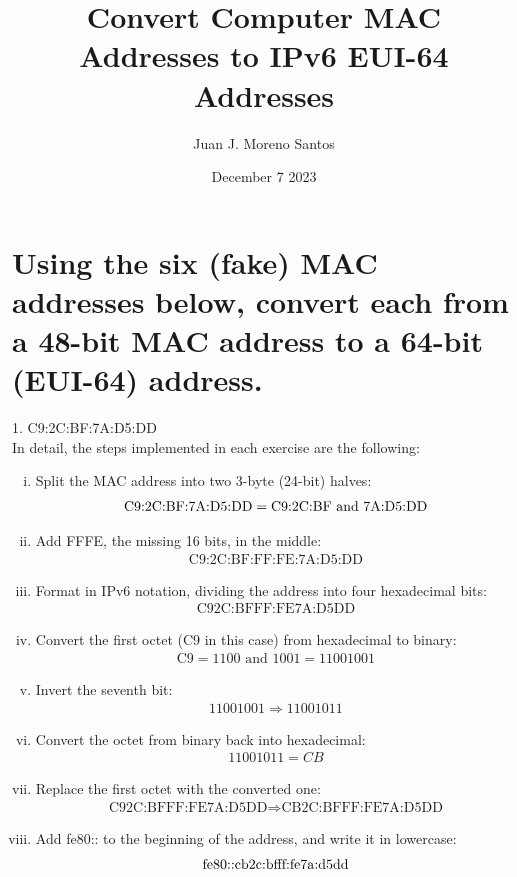 \documentclass[11pt]{article}
\newcommand*{\set}{\setcounter{equation}{0}}
\begin{document}
\title{Convert Computer MAC Addresses to IPv6 EUI-64 Addresses}
\author{Juan J. Moreno Santos}
\date{December 7 2023}

\maketitle
\section{Using the six (fake) MAC addresses below, convert each from a 48-bit MAC address to a 64-bit (EUI-64) address.}
1. C9:2C:BF:7A:D5:DD\\
\indent In detail, the steps implemented in each exercise are the following:
\begin{enumerate}[i.]
    \item Split the MAC address into two 3-byte (24-bit) halves:
        \begin{align}
            \set
            \text{C9:2C:BF:7A:D5:DD} =\text{C9:2C:BF and 7A:D5:DD}
        \end{align}
    \item Add FFFE, the missing 16 bits, in the middle:
        \begin{align}
            \text{C9:2C:BF:FF:FE:7A:D5:DD}
        \end{align}
    \item Format in IPv6 notation, dividing the address into four hexadecimal bits:
        \begin{align}
            \text{C92C:BFFF:FE7A:D5DD}
        \end{align}
    \item Convert the first octet (C9 in this case) from hexadecimal to binary:
        \begin{align}
            \text{C9}=1100\,\,\text{and}\,\, 1001=11001001
        \end{align}
    \item Invert the seventh bit:
        \begin{align}
            11001001\Rightarrow 11001011
        \end{align}
    \item Convert the octet from binary back into hexadecimal:
        \begin{align}
            11001011=CB
        \end{align}
    \item Replace the first octet with the converted one:
        \begin{align}
            \text{C92C:BFFF:FE7A:D5DD}\Rightarrow \text{CB2C:BFFF:FE7A:D5DD}
        \end{align}
    \item Add fe80:: to the beginning of the address, and write it in lowercase:
        \begin{align}
            \lowercase\text{FE80::CB2C:BFFF:FE7A:D5DD}
        \end{align}
\end{enumerate}
\end{document}

